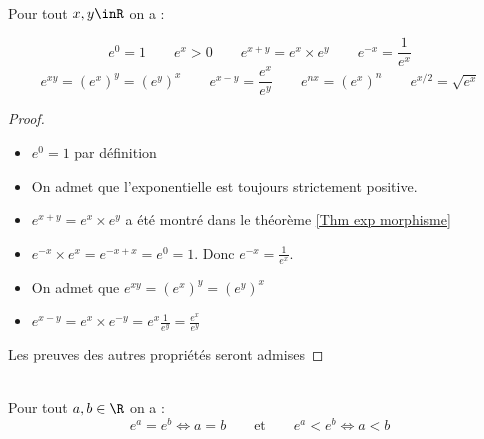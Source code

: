 \documentclass[12pt,fleqn]{report} %
\begin{document}
\begin{proposition}\text{ }\\
	Pour tout $x,y \inR$ on a :
	
	\[e^0=1 \qquad e^x >0 \qquad e^{x + y} = e^x \times e^y \qquad e^{-x} = \frac{1}{e^x}  \]
	\[e^{xy} = \left(e^x\right)^y = \left(e^y\right)^x \qquad e^{x - y} =\frac{e^x}{e^y} \qquad e^{nx} = \left(e^x\right)^n \qquad e^{x/2} = \sqrt{e^x}\]
	
\end{proposition}
\begin{proof}\text{ }\\
	\begin{itemize}
		\item $e^0 = 1$ par définition
		\item On admet que l'exponentielle est toujours strictement positive.
		\item $e^{x+y} = e^x \times e^y$ a été montré dans le théorème \ref{Thm exp morphisme}
		\item $e^{-x} \times e^{x} = e^{-x + x} = e^{0} = 1$. Donc $e^{-x} = \frac{1}{e^{x}}$.
		\item On admet que $e^{xy} = \left(e^{x}\right)^y = \left(e^{y}\right)^x$
		\item $e^{x-y} = e^x  \times e^{-y} = e^{x} \frac{1}{e^y} = \frac{e^x}{e^y}$ 
	\end{itemize}
	Les preuves des autres propriétés seront admises
\end{proof}
\begin{proposition}\text{ }\\
	Pour tout $a,b \in \R$ on a :
	\[
	e^a = e^b \Leftrightarrow a = b \qquad \text{et} \qquad e^a < e^b \Leftrightarrow a<b
	\]
\end{proposition}
\preuveadmise{}
\end{document}

